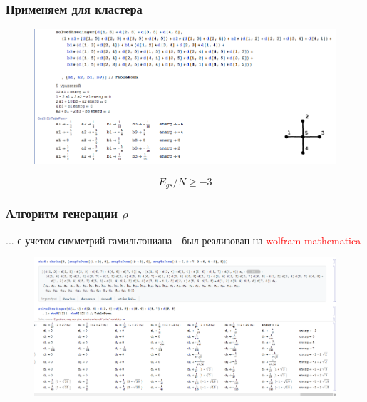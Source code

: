 \documentclass{beamer}
\begin{document}
\begin{frame}
\frametitle{Применяем для кластера}
\begin{figure}
\includegraphics[width=1\linewidth]{solve-crest.png}
\end{figure}
$$E_{gs}/N\geqslant -3$$

\end{frame}
\begin{frame}
\frametitle{Алгоритм генерации $\rho$}
... с учетом симметрий гамильтониана - был реализован на \textcolor{red}{wolfram mathematica}
\begin{figure}
\includegraphics[width=1\linewidth]{result.png}
\end{figure}

\end{frame}
\end{document}
